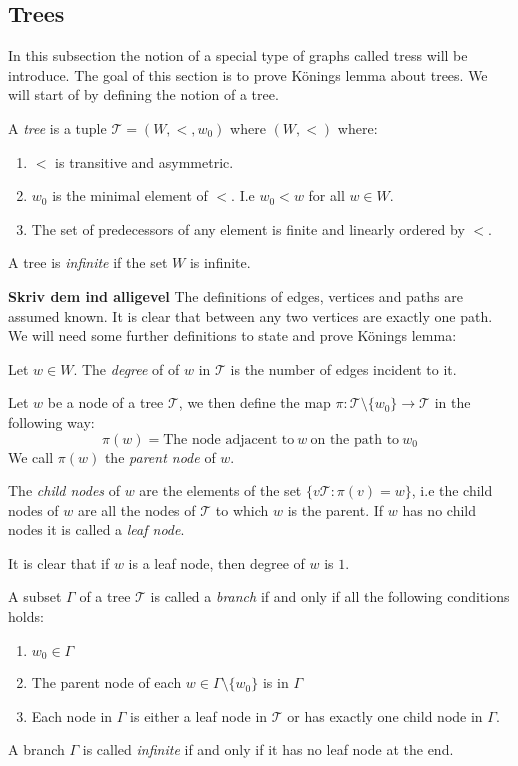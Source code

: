 \documentclass[../main.tex]{subfiles}
\begin{document}
\subsection{Trees}
In this subsection the notion of a special type of graphs called tress will be
introduce. The goal of this section is to prove Könings lemma about trees. We
will start of by defining the notion of a tree.
\begin{defi}
	A \textit{tree} is a tuple $\mathcal{T}=(W,<,w_0)$ where $(W,<)$ where:
	\begin{enumerate}
		\item $<$ is transitive and asymmetric.
		\item $w_0$ is the minimal element of $<$. I.e $w_0
			<w$ for all $w\in W$.
		\item The set of predecessors of any element is finite and
			linearly ordered by $<$.
	\end{enumerate}
	A tree is \textit{infinite} if the set $W$ is infinite.
\end{defi}
\textbf{Skriv dem ind alligevel} The definitions of edges, vertices and paths are assumed known.
It is clear that between any two vertices are exactly one path. We will need
some further definitions to state and prove Könings lemma:
\begin{defi}
	Let $w\in W$. The \textit{degree} of of $w$ in $\mathcal{T}$ is the
	number of edges incident to it.
\end{defi}
\begin{defi}
	Let $w$ be a node of a tree $\mathcal{T}$, we then define the map
	$\pi:\mathcal{T}\setminus\{w_0\}\rightarrow\mathcal{T}$ in the
	following way:
	\[\pi(w)=\text{The node adjacent to}\ w\ \text{on the path to}\ w_0\]
	We call $\pi(w)$ the \textit{parent node} of $w$. 

	The \textit{child nodes} of $w$ are the elements of the set
	$\{v\mathcal{T}:\pi(v)=w\}$, i.e the child nodes of $w$ are all the
	nodes of $\mathcal{T}$ to which $w$ is the parent. If $w$ has no child
	nodes it is called a \textit{leaf node}.
\end{defi}
It is clear that if $w$ is a leaf node, then degree of $w$ is $1$.
\begin{defi}
	A subset $\Gamma$ of a tree $\mathcal{T}$ is called a
	\textit{branch} if and only if all the following conditions holds:
	\begin{enumerate}
		\item $w_0\in\Gamma$
		\item The parent node of each $w\in\Gamma\setminus\{w_0\}$ is
			in $\Gamma$
		\item Each node in $\Gamma$ is either a leaf node in
			$\mathcal{T}$ or has exactly one child node in
			$\Gamma$.
	\end{enumerate}
	A branch $\Gamma$ is called \textit{infinite} if and only if it has no
	leaf node at the end.
\end{defi}
\end{document}
